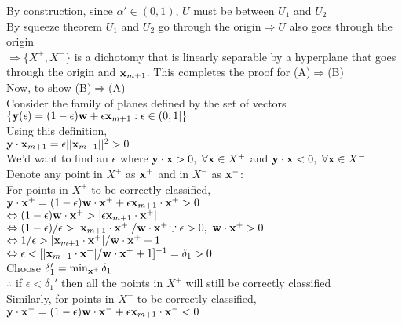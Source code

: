 \documentclass[11pt, oneside]{amsart}   	%
\begin{document}
By construction, since $\alpha'\in(0,1)$, $U$ must be between $U_1$ and $U_2$ \\
By squeeze theorem $U_1$ and $U_2$ go through the origin$\Rightarrow U$ also goes through the origin\\
$\Rightarrow\{X^+,X^-\}$ is a dichotomy that is linearly separable by a hyperplane that goes through the origin and $\bold{x}_{m+1}$. This completes the proof for (A)$\Rightarrow$(B)\\

Now, to show (B)$\Rightarrow$(A)\\
Consider the family of planes defined by the set of vectors $\{\bold{y}(\epsilon)=(1-\epsilon)\bold{w}+\epsilon\bold{x}_{m+1}:\epsilon\in (0,1]\}$\\ 
Using this definition, \\
\indent$\bold{y}\cdot\bold{x}_{m+1}=\epsilon||\bold{x}_{m+1}||^2>0$\\
We'd want to find an $\epsilon$ where $\bold{y}\cdot\bold{x}>0,\ \forall \bold{x}\in X^+$ and $\bold{y}\cdot\bold{x}<0,\ \forall \bold{x}\in X^-$\\
Denote any point in $X^+$ as $\bold{x}^+$ and in $X^-$ as $\bold{x}^-$:\\
For points in $X^+$ to be correctly classified,\\
\indent$\bold{y}\cdot\bold{x}^+=(1-\epsilon)\bold{w}\cdot\bold{x}^++\epsilon\bold{x}_{m+1}\cdot\bold{x}^+>0$\\
\indent$\Leftrightarrow(1-\epsilon)\bold{w}\cdot\bold{x}^+>|\epsilon\bold{x}_{m+1}\cdot\bold{x}^+|$\\
\indent$\Leftrightarrow(1-\epsilon)/\epsilon>|\bold{x}_{m+1}\cdot\bold{x}^+|/\bold{w}\cdot\bold{x}^+$\hfill$\because\epsilon>0,\ \bold{w}\cdot\bold{x}^+>0$\\
\indent$\Leftrightarrow 1/\epsilon>|\bold{x}_{m+1}\cdot\bold{x}^+|/\bold{w}\cdot\bold{x}^++1$\\
\indent$\Leftrightarrow \epsilon<[|\bold{x}_{m+1}\cdot\bold{x}^+|/\bold{w}\cdot\bold{x}^++1]^{-1}=\delta_1>0$\\
\indent Choose $\delta_1'=\min_{\bold{x}^+}\delta_1$\\
\indent$\therefore$ if $\epsilon<\delta_1'$ then all the points in $X^+$ will still be correctly classified\\
Similarly, for points in $X^-$ to be correctly classified,\\
\indent$\bold{y}\cdot\bold{x}^-=(1-\epsilon)\bold{w}\cdot\bold{x}^-+\epsilon\bold{x}_{m+1}\cdot\bold{x}^-<0$\\
\end{document}

